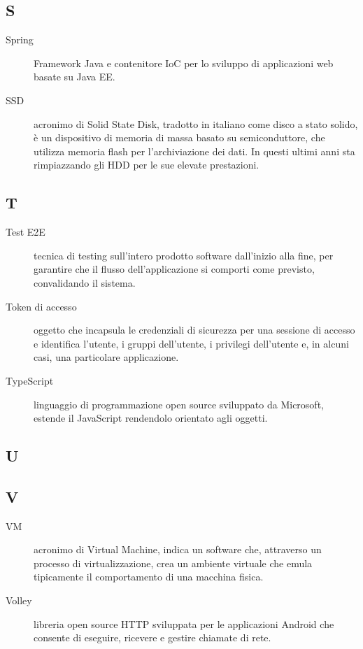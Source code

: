 \documentclass[../manuale-manutentore.tex]{subfiles}
\begin{document}
\subsection{S}

\begin{description}
    \item[Spring] Framework Java e contenitore IoC per lo sviluppo di applicazioni web basate su Java EE\@.
    \item[SSD] acronimo di Solid State Disk, tradotto in italiano come disco a stato solido, è un dispositivo di memoria di massa basato su semiconduttore, che utilizza memoria flash per l'archiviazione dei dati. In questi ultimi anni sta rimpiazzando gli HDD per le sue elevate prestazioni.
\end{description}

\subsection{T}

\begin{description}
    \item[Test E2E] tecnica di testing sull'intero prodotto software dall'inizio alla fine, per garantire che il flusso dell'applicazione si comporti come previsto, convalidando il sistema.
    \item[Token di accesso] oggetto che incapsula le credenziali di sicurezza per una sessione di accesso e identifica l'utente, i gruppi dell'utente, i privilegi dell'utente e, in alcuni casi, una particolare applicazione.
    \item[TypeScript] linguaggio di programmazione open source sviluppato da Microsoft, estende il JavaScript rendendolo orientato agli oggetti.
\end{description}

\subsection{U}

\subsection{V}

\begin{description}
    \item[VM] acronimo di Virtual Machine, indica un software che, attraverso un processo di virtualizzazione, crea un ambiente virtuale che emula tipicamente il comportamento di una macchina fisica.
    \item[Volley] libreria open source HTTP sviluppata per le applicazioni Android che consente di eseguire, ricevere e gestire chiamate di rete.
\end{description}
\end{document}
